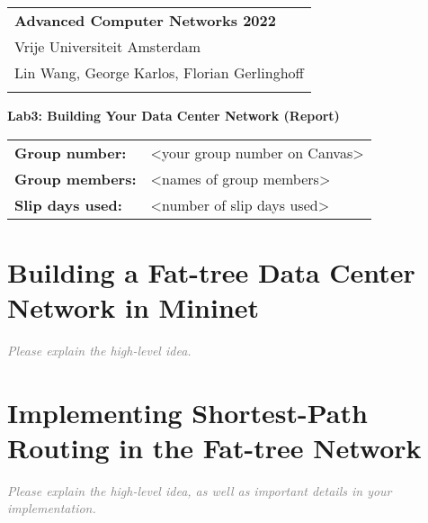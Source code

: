 \documentclass[a4paper,11pt]{article}
\newcommand{\note}[1]{\textit{\textcolor{gray}{#1}}}
\begin{document}
\thispagestyle{empty} 

\begin{tabular}{@{}p{15.5cm}} 
{\bf Advanced Computer Networks 2022} \\
Vrije Universiteit Amsterdam  \\ Lin Wang, George Karlos, Florian Gerlinghoff\\
\hline 
\\
\end{tabular} 

\vspace*{0.3cm} 

{\LARGE \bf Lab3: Building Your Data Center Network (Report)} 

\vspace*{0.3cm} 


\begin{tcolorbox}[sharp corners, colback=blue!5!white]
\begin{tabular}{@{}ll}
\textbf{Group number:} & <your group number on Canvas> \\
\textbf{Group members:} & <names of group members> \\
\textbf{Slip days used:} & <number of slip days used> \\
\end{tabular}
\end{tcolorbox}

\vspace{0.4cm}


\section{Building a Fat-tree Data Center Network in Mininet}

\note{Please explain the high-level idea.}

\section{Implementing Shortest-Path Routing in the Fat-tree Network}

\note{Please explain the high-level idea, as well as important details in your implementation.}
\end{document}
